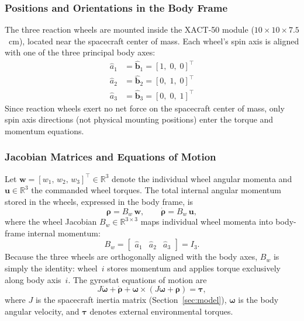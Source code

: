 \subsubsection{Positions and Orientations in the Body Frame}

The three reaction wheels are mounted inside the XACT-50 module
($10\times10\times7.5$~cm), located near the spacecraft center of mass.
Each wheel's spin axis is aligned with one of the three principal body axes:
\begin{align*}
    \hat{a}_1 &= \hat{\mathbf{b}}_1 = [1,\;0,\;0]^\top \\
    \hat{a}_2 &= \hat{\mathbf{b}}_2 = [0,\;1,\;0]^\top \\
    \hat{a}_3 &= \hat{\mathbf{b}}_3 = [0,\;0,\;1]^\top
\end{align*}
Since reaction wheels exert no net force on the spacecraft center of mass,
only spin axis directions (not physical mounting positions) enter the
torque and momentum equations.

\subsubsection{Jacobian Matrices and Equations of Motion}

Let $\mathbf{w} = [w_1,\,w_2,\,w_3]^\top \in \mathbb{R}^3$ denote the
individual wheel angular momenta and
$\mathbf{u} \in \mathbb{R}^3$ the commanded wheel torques.
The total internal angular momentum stored in the wheels, expressed in the
body frame, is
\begin{equation}
    \boldsymbol{\rho} = B_w\,\mathbf{w}, \qquad
    \dot{\boldsymbol{\rho}} = B_w\,\mathbf{u},
\end{equation}
where the wheel Jacobian $B_w \in \mathbb{R}^{3\times 3}$ maps individual
wheel momenta into body-frame internal momentum:
\begin{equation}
    B_w = \begin{bmatrix} \hat{a}_1 & \hat{a}_2 & \hat{a}_3 \end{bmatrix}
        = I_3.
\end{equation}
Because the three wheels are orthogonally aligned with the body axes,
$B_w$ is simply the identity: wheel~$i$ stores momentum and applies torque
exclusively along body axis~$i$.
The gyrostat equations of motion are
\begin{equation}
    J\dot{\boldsymbol{\omega}} + \dot{\boldsymbol{\rho}}
    + \boldsymbol{\omega} \times (J\boldsymbol{\omega} + \boldsymbol{\rho})
    = \boldsymbol{\tau},
\end{equation}
where $J$ is the spacecraft inertia matrix (Section~\ref{sec:model}),
$\boldsymbol{\omega}$ is the body angular velocity, and
$\boldsymbol{\tau}$ denotes external environmental torques.

